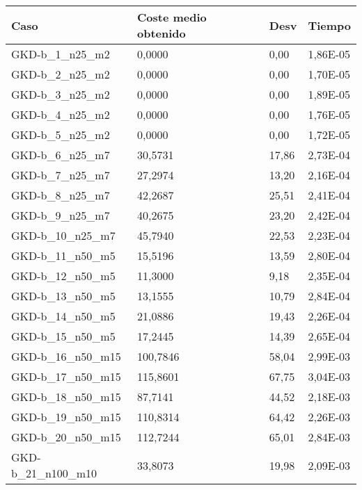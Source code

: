 \pagebreak

\begin{table}[!ht]
    \centering
    \begin{adjustbox}{height=12cm}
    \begin{tabular}{|l|l|l|l|}
    \hline
        Caso & Coste medio obtenido & Desv & Tiempo \\ \hline
        GKD-b\_1\_n25\_m2 & 0,0000 & 0,00 & 1,86E-05 \\ \hline
        GKD-b\_2\_n25\_m2 & 0,0000 & 0,00 & 1,70E-05 \\ \hline
        GKD-b\_3\_n25\_m2 & 0,0000 & 0,00 & 1,89E-05 \\ \hline
        GKD-b\_4\_n25\_m2 & 0,0000 & 0,00 & 1,76E-05 \\ \hline
        GKD-b\_5\_n25\_m2 & 0,0000 & 0,00 & 1,72E-05 \\ \hline
        GKD-b\_6\_n25\_m7 & 30,5731 & 17,86 & 2,73E-04 \\ \hline
        GKD-b\_7\_n25\_m7 & 27,2974 & 13,20 & 2,16E-04 \\ \hline
        GKD-b\_8\_n25\_m7 & 42,2687 & 25,51 & 2,41E-04 \\ \hline
        GKD-b\_9\_n25\_m7 & 40,2675 & 23,20 & 2,42E-04 \\ \hline
        GKD-b\_10\_n25\_m7 & 45,7940 & 22,53 & 2,23E-04 \\ \hline
        GKD-b\_11\_n50\_m5 & 15,5196 & 13,59 & 2,80E-04 \\ \hline
        GKD-b\_12\_n50\_m5 & 11,3000 & 9,18 & 2,35E-04 \\ \hline
        GKD-b\_13\_n50\_m5 & 13,1555 & 10,79 & 2,84E-04 \\ \hline
        GKD-b\_14\_n50\_m5 & 21,0886 & 19,43 & 2,26E-04 \\ \hline
        GKD-b\_15\_n50\_m5 & 17,2445 & 14,39 & 2,65E-04 \\ \hline
        GKD-b\_16\_n50\_m15 & 100,7846 & 58,04 & 2,99E-03 \\ \hline
        GKD-b\_17\_n50\_m15 & 115,8601 & 67,75 & 3,04E-03 \\ \hline
        GKD-b\_18\_n50\_m15 & 87,7141 & 44,52 & 2,18E-03 \\ \hline
        GKD-b\_19\_n50\_m15 & 110,8314 & 64,42 & 2,26E-03 \\ \hline
        GKD-b\_20\_n50\_m15 & 112,7244 & 65,01 & 2,84E-03 \\ \hline
        GKD-b\_21\_n100\_m10 & 33,8073 & 19,98 & 2,09E-03 \\ \hline

\end{tabular}
\end{adjustbox}
\end{table}
